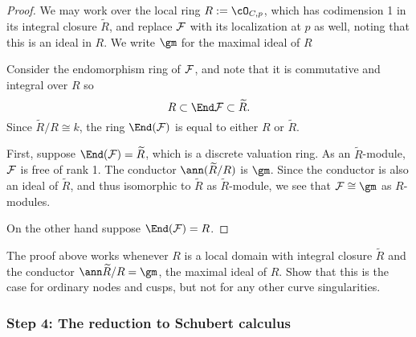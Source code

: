 \begin{proof} We may work over the local ring $R := \cO_{C,p}$, which has codimension
1 in its integral closure $\widetilde R$, and replace $\cF$ with 
its localization at $p$ as well, noting that this is an ideal in $R$. We write
$\gm$ for the maximal ideal of $R$

Consider the endomorphism ring of $\cF$, and note that it is commutative and integral over $R$ so 
$$
R \subset \End \cF \subset \widetilde R.
$$
Since
$\widetilde R/R \cong k$, the ring $\End(\cF)$ is equal to either 
$R$ or $\widetilde R$. 

First, suppose
$\End(\cF)=\widetilde R$, which is a discrete valuation ring.
 As an 
$\widetilde R$-module, $\cF$ is free of rank 1.  The conductor
$\ann(\widetilde R/R)$ is $\gm$.
Since the conductor is also an ideal of $\widetilde R$, and thus isomorphic to $\widetilde R$
as $\widetilde R$-module,
we see that $\cF \cong \gm$ as $R$-modules.

On the other hand suppose
$\End(\cF)=R$. 
\end{proof}

\begin{exercise}
 The proof above works whenever $R$ is a local domain with integral closure $\widetilde R$ and the conductor
 $\ann \widetilde R/R = \gm$,
 the maximal ideal of $R$. Show that this is the case for ordinary nodes and cusps, but not for any other curve singularities.
\end{exercise}

%


\subsubsection{Step 4: The reduction to Schubert calculus}

